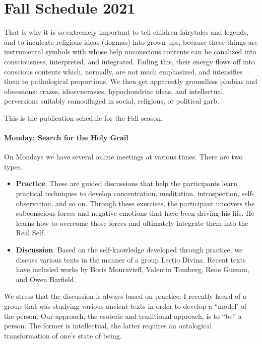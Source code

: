 \section{Fall Schedule 2021}

\begin{quotex}
That is why it is so extremely important to tell children fairytales and legends, and to inculcate religious ideas (dogmas) into grown-ups, because these things are instrumental symbols with whose help unconscious contents can be canalized into consciousness, interpreted, and integrated. Failing this, their energy flows off into conscious contents which, normally, are not much emphasized, and intensifies them to pathological proportions. We then get apparently groundless phobias and obsessions: crazes, idiosyncrasies, hypochondriac ideas, and intellectual perversions suitably camouflaged in social, religious, or political garb.
\end{quotex}


This is the publication schedule for the Fall season.

\paragraph{Monday: Search for the Holy Grail}


On Mondays we have several online meetings at various times. There are two types.

\begin{itemize}


\item \textbf{Practice}. These are guided discussions that help the participants learn practical techniques to develop concentration, meditation, introspection, self-observation, and so on. Through these exercises, the participant uncovers the subconscious forces and negative emotions that have been driving his life. He learns how to overcome those forces and ultimately integrate them into the Real Self.

\item \textbf{Discussion}. Based on the self-knowledge developed through practice, we discuss various texts in the manner of a group Lectio Divina. Recent texts have included works by Boris Mouravieff, Valentin Tomberg, Rene Guenon, and Owen Barfield.
\end{itemize}


We stress that the discussion is always based on practice. I recently heard of a group that was studying various ancient texts in order to develop a ``model' of the person. Our approach, the esoteric and traditional approach, is to ``be'' a person. The former is intellectual, the latter requires an ontological transformation of one's state of being.

